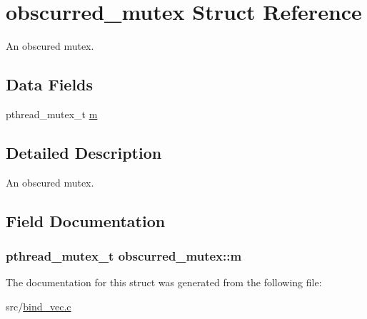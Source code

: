 \hypertarget{structobscurred__mutex}{}\section{obscurred\+\_\+mutex Struct Reference}
\label{structobscurred__mutex}


An obscured mutex.  


\subsection*{Data Fields}
\begin{DoxyCompactItemize}
\item 
pthread\+\_\+mutex\+\_\+t \hyperlink{structobscurred__mutex_a02b4b692e6fc0a9b4849671117317201}{m}
\end{DoxyCompactItemize}


\subsection{Detailed Description}
An obscured mutex. 

\subsection{Field Documentation}
\subsubsection[{\texorpdfstring{m}{m}}]{\setlength{\rightskip}{0pt plus 5cm}pthread\+\_\+mutex\+\_\+t obscurred\+\_\+mutex\+::m}\hypertarget{structobscurred__mutex_a02b4b692e6fc0a9b4849671117317201}{}\label{structobscurred__mutex_a02b4b692e6fc0a9b4849671117317201}


The documentation for this struct was generated from the following file\+:\begin{DoxyCompactItemize}
\item 
src/\hyperlink{bind__vec_8c}{bind\+\_\+vec.\+c}\end{DoxyCompactItemize}
